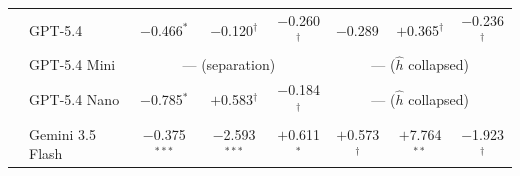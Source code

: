 \begin{tabular}{ll ccc ccc}
  & GPT-5.4 & $-$0.466$^{*}$ & $-$0.120$^\dagger$ & $-$0.260$^\dagger$ & $-$0.289$^{}$ & $+$0.365$^\dagger$ & $-$0.236$^\dagger$ \\
  & GPT-5.4 Mini & \multicolumn{3}{c}{--- \tiny{(separation)}} & \multicolumn{3}{c}{--- \tiny{($\hat h$ collapsed)}} \\
  & GPT-5.4 Nano & $-$0.785$^{*}$ & $+$0.583$^\dagger$ & $-$0.184$^\dagger$ & \multicolumn{3}{c}{--- \tiny{($\hat h$ collapsed)}} \\
  & Gemini 3.5 Flash & $-$0.375$^{***}$ & $-$2.593$^{***}$ & $+$0.611$^{*}$ & $+$0.573$^\dagger$ & $+$7.764$^{**}$ & $-$1.923$^\dagger$ \\
\bottomrule
\end{tabular}